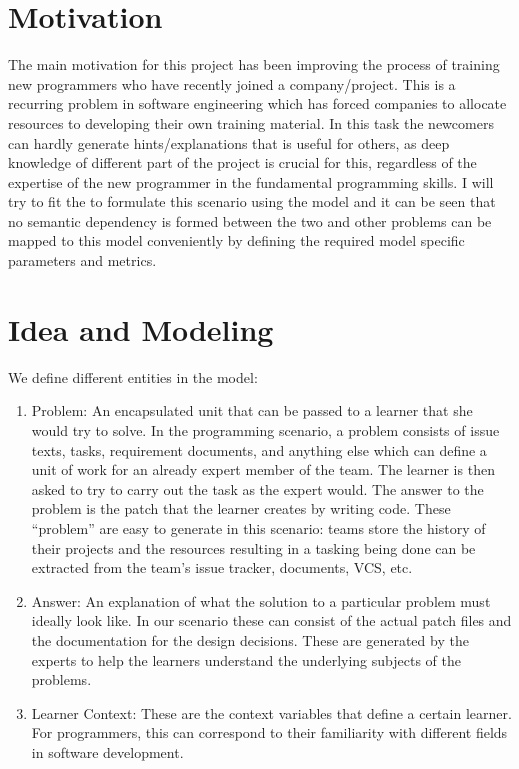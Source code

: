 \documentclass[conference]{IEEEtran}
\begin{document}
	\section{Motivation}
	The main motivation for this project has been improving the process of training new programmers who have
	recently joined a company/project. This is a recurring problem in software engineering which has forced
	companies to allocate resources to developing their own training material. In this task the newcomers can
	hardly generate hints/explanations that is useful for others, as deep knowledge of different part of the
	project is crucial for this, regardless of the expertise of the new programmer in the fundamental
	programming skills. I will try to fit the to formulate this scenario using the model and it can be
	seen that no semantic dependency is formed between the two and other problems can be mapped to this 
	model conveniently by defining the required model specific parameters and metrics.
		
	\section{Idea and Modeling}
	
	We define different entities in the model:\\
	\begin{enumerate}
		\item Problem: An encapsulated unit that can be passed to a learner that she would try to solve. In the
		programming scenario, a problem consists of issue texts, tasks, requirement documents, and anything else
		which can define a unit of work for an already expert member of the team. The learner is then asked to
		try to carry out the task as the expert would. The answer to the problem is the patch that the learner
		creates by writing code. These ``problem'' are easy to generate in this scenario: teams store the
		history of their projects and the resources resulting in a tasking being done can be extracted from the
		team's issue tracker, documents, VCS, etc.
		
		\item Answer: An explanation of what the solution to a particular problem must ideally look like. In our
		scenario these can consist of the actual patch files and the documentation for the design decisions.
		These are generated by the experts to help the learners understand the underlying subjects of the problems.
		
		\item Learner Context: These are the context variables that define a certain learner. For programmers, this
		can correspond to their familiarity with different fields in software development.\\
	\end{enumerate}
\end{document}
